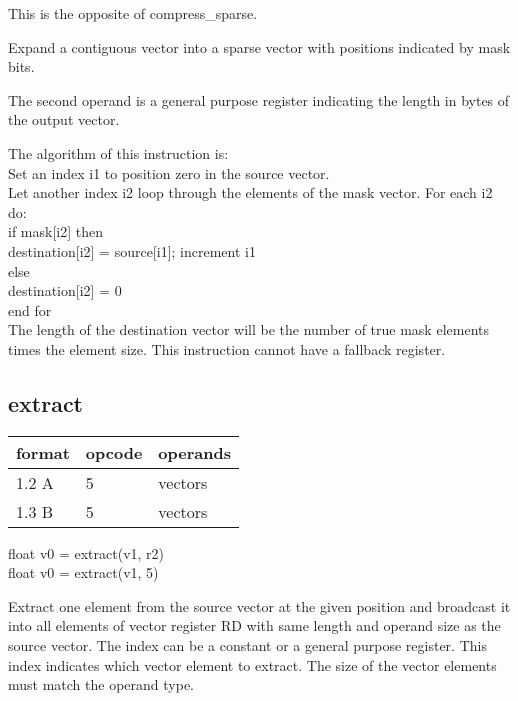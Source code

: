 \documentclass[forwardcom.tex]{subfiles}
\begin{document}
This is the opposite of compress\_sparse.

Expand a contiguous vector into a sparse vector with positions indicated by mask bits. 

The second operand is a general purpose register indicating the length in bytes of the output vector.
\vv

The algorithm of this instruction is:\\
Set an index i1 to position zero in the source vector.\\
Let another index i2 loop through the elements of the mask vector. For each i2 do:\\
\hspace{4mm} if mask[i2] then\\
\hspace{8mm}   destination[i2] = source[i1]; increment i1\\
\hspace{4mm} else\\
\hspace{8mm}   destination[i2] = 0\\
  end for\\
  
\vv
The length of the destination vector will be the number of true mask elements
times the element size. This instruction cannot have a fallback register.
\vv


\subsection{extract}
\label{table:extractInstruction}
\begin{tabular}{|p{12mm}|p{15mm}|p{100mm}|}
\hline
\bfseries format & \bfseries opcode & \bfseries operands \\ \hline
1.2 A &  5 & vectors  \\ \hline
1.3 B &  5 & vectors  \\ \hline
\end{tabular}
\vv

float v0 = extract(v1, r2)\\
float v0 = extract(v1, 5)
\vv

Extract one element from the source vector at the given position and 
broadcast it into all elements of vector register RD with same length and operand size as the source vector. 
The index can be a constant or a general purpose register. 
This index indicates which vector element to extract. 
The size of the vector elements must match the operand type. 
\vv
\end{document}
